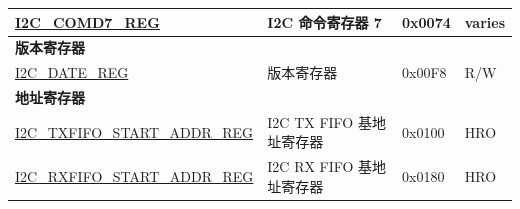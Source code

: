 \begin{longtable}{ | p{6cm} | p{7cm} | p{1.3cm} | p{1cm} | }
\hyperref[regdesc:I2CCOMD7REG]{I2C\_COMD7\_REG} & I2C 命令寄存器 7 & 0x0074 & varies \\ \hline
\multicolumn{4}{|l|}{\textbf{版本寄存器}} \\ \hline
\hyperref[regdesc:I2CDATEREG]{I2C\_DATE\_REG} & 版本寄存器 & 0x00F8 & R/W \\ \hline
\multicolumn{4}{|l|}{\textbf{地址寄存器}} \\ \hline
\hyperref[regdesc:I2CTXFIFOSTARTADDRREG]{I2C\_TXFIFO\_START\_ADDR\_REG} & I2C TX FIFO 基地址寄存器 & 0x0100 & HRO \\ \hline
\hyperref[regdesc:I2CRXFIFOSTARTADDRREG]{I2C\_RXFIFO\_START\_ADDR\_REG} & I2C RX FIFO 基地址寄存器 & 0x0180 & HRO \\ \hline
\end{longtable}
